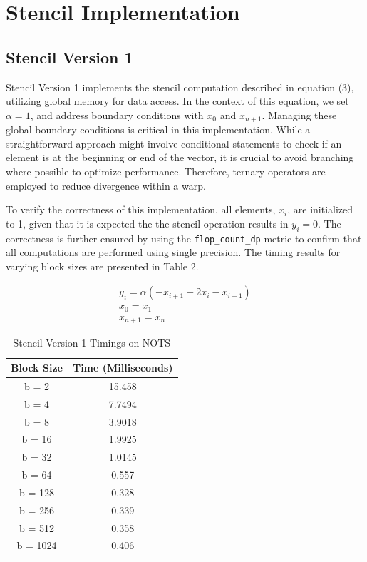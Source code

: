 \documentclass{article}
\begin{document}
\section{Stencil Implementation}

\subsection{Stencil Version 1}

Stencil Version 1 implements the stencil computation described in equation (3), utilizing global memory for data access. In the context of this equation, we set $\alpha = 1$, and address boundary conditions with $x_0$ and $x_{n+1}$. Managing these global boundary conditions is critical in this implementation. While a straightforward approach might involve conditional statements to check if an element is at the beginning or end of the vector, it is crucial to avoid branching where possible to optimize performance. Therefore, ternary operators are employed to reduce divergence within a warp.

\bigskip
\noindent
To verify the correctness of this implementation, all elements, $x_i$, are initialized to 1, given that it is expected the the stencil operation results in $y_i = 0$. The correctness is further ensured by using the \texttt{flop\_count\_dp} metric to confirm that all computations are performed using single precision. The timing results for varying block sizes are presented in Table 2.

\begin{gather}
    y_i = \alpha (-x_{i+1} + 2x_i - x_{i-1}) \nonumber \\
    x_0 = x_1 \nonumber \\
    x_{n+1} = x_n
\end{gather}

\clearpage

\begin{table}[ht!]
    \caption{Stencil Version 1 Timings on NOTS}
    \centering
    \begin{tabular}{|c|c|}
        \hline
        Block Size & Time (Milliseconds) \\
        \hline
        b = 2 & 15.458\\
        \hline
        b = 4 & 7.7494\\
        \hline
        b = 8 & 3.9018\\
        \hline
        b = 16 & 1.9925\\
        \hline
        b = 32 & 1.0145\\
        \hline
        b = 64 & 0.557\\
        \hline
        b = 128 & 0.328\\
        \hline
        b = 256 & 0.339\\
        \hline
        b = 512 & 0.358\\
        \hline
        b = 1024 & 0.406\\
        \hline
    \end{tabular}
\end{table}
\end{document}
